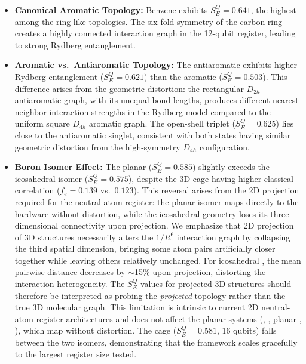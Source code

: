\documentclass[12pt,a4paper]{article}
\begin{document}
\begin{itemize}
    \item \textbf{Canonical Aromatic Topology:} Benzene  exhibits
    $S_E^Q = 0.641$, the highest among the ring-like topologies. The six-fold
    symmetry of the carbon ring creates a highly connected
    interaction graph in the 12-qubit register, leading to strong
    Rydberg entanglement.

    \item \textbf{Aromatic vs.\ Antiaromatic Topology:} The antiaromatic  exhibits
    higher Rydberg entanglement ($S_E^{Q} = 0.621$) than the aromatic 
    ($S_E^{Q} = 0.503$). This difference arises from the geometric
    distortion: the rectangular $D_{2h}$ antiaromatic graph, with its
    unequal bond lengths, produces different nearest-neighbor interaction
    strengths in the Rydberg model compared to the uniform square $D_{4h}$
    aromatic graph.
    The open-shell triplet ($S_E^Q = 0.625$) lies close to the antiaromatic
    singlet, consistent with both states having similar geometric distortion
    from the high-symmetry $D_{4h}$ configuration.

    \item \textbf{Boron Isomer Effect:} The planar  ($S_E^Q = 0.585$)
    slightly exceeds the icosahedral isomer ($S_E^Q = 0.575$), despite the 3D cage
    having higher classical correlation ($f_e = 0.139$ vs.\ $0.123$). This reversal
    arises from the 2D projection required for the neutral-atom register: the planar
    isomer maps directly to the hardware without distortion, while the icosahedral
    geometry loses its three-dimensional connectivity upon projection.
    We emphasize that 2D projection of 3D structures necessarily alters
    the $1/R^6$ interaction graph by collapsing the third spatial dimension,
    bringing some atom pairs artificially closer together while leaving
    others relatively unchanged. For icosahedral , the mean
    pairwise distance decreases by $\sim$15\% upon projection,
    distorting the interaction heterogeneity.
    The $S_E^Q$ values for projected 3D structures should therefore be interpreted
    as probing the \emph{projected} topology rather than the true 3D molecular graph.
    This limitation is intrinsic to current 2D neutral-atom register architectures and
    does not affect the planar systems (, , planar , ),
    which map without distortion.
    The  cage ($S_E^Q = 0.581$, 16 qubits) falls between the two
     isomers, demonstrating that the framework scales gracefully
    to the largest register size tested.


\end{itemize}
\end{document}

